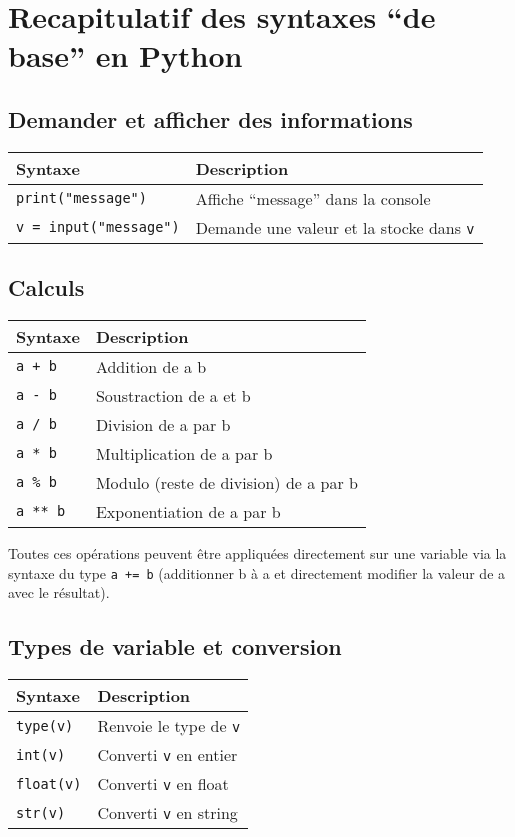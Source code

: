 \documentclass[]{article}
\date{}
\begin{document}
\hypertarget{recapitulatif-des-syntaxes-de-base-en-python}{%
\section{Recapitulatif des syntaxes ``de base'' en
Python}\label{recapitulatif-des-syntaxes-de-base-en-python}}

\hypertarget{demander-et-afficher-des-informations}{%
\subsection{Demander et afficher des
informations}\label{demander-et-afficher-des-informations}}

\begin{longtable}[]{@{}ll@{}}
\toprule
Syntaxe & Description\tabularnewline
\midrule
\endhead
\texttt{print("message")} & Affiche ``message'' dans la
console\tabularnewline
\texttt{v\ =\ input("message")} & Demande une valeur et la stocke dans
\texttt{v}\tabularnewline
\bottomrule
\end{longtable}

\hypertarget{calculs}{%
\subsection{Calculs}\label{calculs}}

\begin{longtable}[]{@{}ll@{}}
\toprule
Syntaxe & Description\tabularnewline
\midrule
\endhead
\texttt{a\ +\ b} & Addition de a b\tabularnewline
\texttt{a\ -\ b} & Soustraction de a et b\tabularnewline
\texttt{a\ /\ b} & Division de a par b\tabularnewline
\texttt{a\ *\ b} & Multiplication de a par b\tabularnewline
\texttt{a\ \%\ b} & Modulo (reste de division) de a par b\tabularnewline
\texttt{a\ **\ b} & Exponentiation de a par b\tabularnewline
\bottomrule
\end{longtable}

Toutes ces opérations peuvent être appliquées directement sur une
variable via la syntaxe du type \texttt{a\ +=\ b} (additionner b à a et
directement modifier la valeur de a avec le résultat).

\hypertarget{types-de-variable-et-conversion}{%
\subsection{Types de variable et
conversion}\label{types-de-variable-et-conversion}}

\begin{longtable}[]{@{}ll@{}}
\toprule
Syntaxe & Description\tabularnewline
\midrule
\endhead
\texttt{type(v)} & Renvoie le type de \texttt{v}\tabularnewline
\texttt{int(v)} & Converti \texttt{v} en entier\tabularnewline
\texttt{float(v)} & Converti \texttt{v} en float\tabularnewline
\texttt{str(v)} & Converti \texttt{v} en string\tabularnewline
\bottomrule
\end{longtable}
\end{document}

